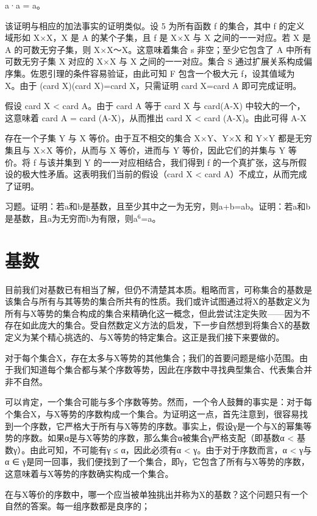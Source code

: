 \documentclass[12pt,a4paper]{ctexbook}
\theoremstyle{definition}
\theoremstyle{remark}
\begin{document}
{a·a = a。

该证明与相应的加法事实的证明类似。设 5 为所有函数 f 的集合，其中 f 的定义域形如 X×X，X 是 A 的某个子集，且 f 是 X×X 与 X 之间的一一对应。若 X 是 A 的可数无穷子集，则 X×X～X。这意味着集合 s 非空；至少它包含了 A 中所有可数无穷子集 X 对应的 X×X 与 X 之间的一一对应。集合 S 通过扩展关系构成偏序集。佐恩引理的条件容易验证，由此可知 F 包含一个极大元 f，设其值域为 X。由于 (card X)(card X)=card X，只需证明 card X=card A 即可完成证明。

假设 card X < card A。由于 card A 等于 card X 与 card(A-X) 中较大的一个，这意味着 card A = card (A-X)，从而推出 card X < card (A-X)。由此可得 A-X

存在一个子集 Y 与 X 等价。由于互不相交的集合 X×Y、Y×X 和 Y×Y 都是无穷集且与 X×X 等价，从而与 X 等价，进而与 Y 等价，因此它们的并集与 Y 等价。将 f 与该并集到 Y 的一一对应相结合，我们得到 f 的一个真扩张，这与所假设的极大性矛盾。这表明我们当前的假设（card X < card A）不成立，从而完成了证明。

习题。证明：若a和b是基数，且至少其中之一为无穷，则a+b=ab。证明：若a和b是基数，且a为无穷而b为有限，则a$^{6}$=a。


\chapter{基数}

目前我们对基数已有相当了解，但仍不清楚其本质。粗略而言，可称集合的基数是该集合与所有与其等势的集合所共有的性质。我们或许试图通过将X的基数定义为所有与X等势的集合构成的集合来精确化这一概念，但此尝试注定失败——因为不存在如此庞大的集合。受自然数定义方法的启发，下一步自然想到将集合X的基数定义为某个精心挑选的、与X等势的特定集合。这正是我们接下来要做的。

对于每个集合X，存在太多与X等势的其他集合；我们的首要问题是缩小范围。由于我们知道每个集合都与某个序数等势，因此在序数中寻找典型集合、代表集合并非不自然。

可以肯定，一个集合可能与多个序数等势。然而，一个令人鼓舞的事实是：对于每个集合X，与X等势的序数构成一个集合。为证明这一点，首先注意到，很容易找到一个序数，它严格大于所有与X等势的序数。事实上，假设γ是一个与X的幂集等势的序数。如果α是与X等势的序数，那么集合α被集合γ严格支配（即基数α < 基数γ）。由此可知，不可能有γ ≤ α，因此必须有α < γ。由于对于序数而言，α < γ与α ∈ γ是同一回事，我们便找到了一个集合，即γ，它包含了所有与X等势的序数，这意味着与X等势的序数确实构成一个集合。

在与X等价的序数中，哪一个应当被单独挑出并称为X的基数？这个问题只有一个自然的答案。每一组序数都是良序的；

}
\end{document}
